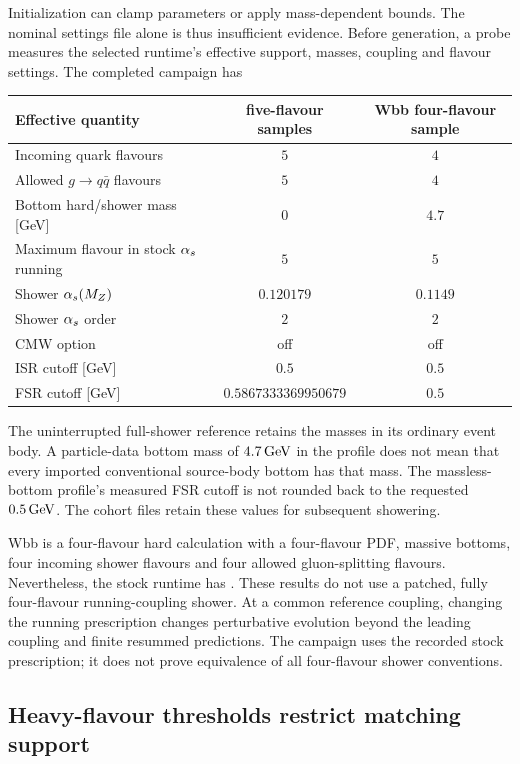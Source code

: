 Initialization can clamp parameters or apply mass-dependent bounds.
The nominal settings file alone is thus insufficient evidence.
Before generation, a probe measures the selected runtime's effective
support, masses, coupling and flavour settings.
The completed campaign has
\begin{center}
\begin{tabular}{lcc}
\toprule
Effective quantity & five-flavour samples & Wbb four-flavour sample\\
\midrule
Incoming quark flavours & $5$ & $4$\\
Allowed $g\to q\bar q$ flavours & $5$ & $4$\\
Bottom hard/shower mass [GeV] & $0$ & $4.7$\\
Maximum flavour in stock $\alpha_s$ running & $5$ & $5$\\
Shower $\alpha_s(M_Z)$ & $0.120179$ & $0.1149$\\
Shower $\alpha_s$ order & $2$ & $2$\\
CMW option & off & off\\
ISR cutoff [GeV] & $0.5$ & $0.5$\\
FSR cutoff [GeV] & $0.5867333369950679$ & $0.5$\\
\bottomrule
\end{tabular}
\end{center}
The uninterrupted full-shower reference retains the masses in its
ordinary event body. A particle-data bottom mass of $4.7\,\mathrm{GeV}$ in the
profile does not mean that every imported conventional source-body
bottom has that mass.
The massless-bottom profile's measured FSR cutoff is not rounded
back to the requested $0.5\,\mathrm{GeV}$.
The cohort  files retain these values for
subsequent showering.

Wbb is a four-flavour hard calculation with a four-flavour PDF,
massive bottoms, four incoming shower flavours and four allowed
gluon-splitting flavours.
Nevertheless, the stock runtime has
.
These results do not use a patched, fully four-flavour
running-coupling shower.
At a common reference coupling, changing the running prescription
changes perturbative evolution beyond the leading coupling and
finite resummed predictions.
The campaign uses the recorded stock prescription; it does not prove
equivalence of all four-flavour shower conventions.

\subsection{Heavy-flavour thresholds restrict matching support}
\label{sec:masses-thresholds}

